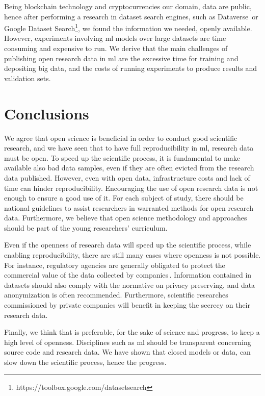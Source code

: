 Being blockchain technology and cryptocurrencies our domain,
data are public, hence after performing a research in dataset search engines, such as
Dataverse\,\cite{crosas2011dataverse} or Google Dataset
Search\footnote{https://toolbox.google.com/datasetsearch},
we found the information we needed, openly available. However, experiments involving \ac{ml} models
over large datasets are time consuming and expensive to run. We derive that the main
challenges of publishing open research data in \ac{ml} are the excessive time for training and
depositing big data, and the costs of running experiments to produce results and validation sets.

\section{Conclusions}
We agree that open science is beneficial in order to conduct good scientific research,
and we have seen that to have full reproducibility in \ac{ml}, research data must be open.
To speed up the scientific process, it is fundamental to make available also bad data samples, even if
they are often evicted from the research data published.
However, even with open data, infrastructure costs and lack of time can hinder reproducibility.
Encouraging the use of open research data is not enough to ensure a good use of it. For each subject of study,
there should be national guidelines to assist researchers in warranted methods for open research data.
Furthermore, we believe that open science methodology and approaches should
be part of the young researchers' curriculum.

Even if the openness of research data will speed up the scientific process,
while enabling reproducibility, there are still many cases where openness is not
possible. For instance, regulatory agencies are generally obligated to protect the commercial
value of the data collected by companies\,\cite{national2016principles}.
Information contained in datasets should also comply with the normative on privacy preserving,
and data anonymization is often recommended. Furthermore, scientific researches
commissioned by private companies will benefit in keeping the secrecy on their research data.

Finally, we think that is preferable, for the sake of science and progress, to keep a high
level of openness. Disciplines such as \ac{ml} should be transparent concerning source code
and research data. We have shown that closed models or data, can slow
down the scientific process, hence the progress.



